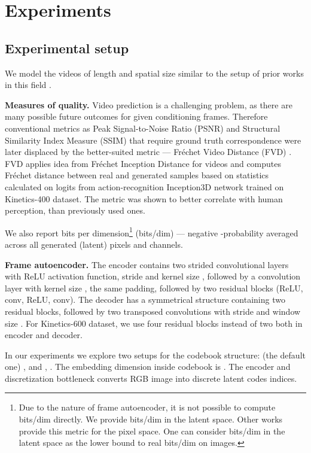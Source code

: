 \documentclass{article}
\begin{document}
 \section{Experiments}


\subsection{Experimental setup}

We model the videos of length  and spatial size  similar to the setup of prior works in this field \cite{dvdgan, vt}.

\textbf{Measures of quality.} Video prediction is a challenging problem, as there are many possible future outcomes for given conditioning frames. Therefore conventional metrics as Peak Signal-to-Noise Ratio (PSNR) and Structural Similarity Index Measure (SSIM) that require ground truth correspondence were later displaced by the better-suited metric --- Fréchet Video Distance (FVD) \cite{fid}. FVD applies idea from Fréchet Inception Distance \cite{fid} for videos and computes Fréchet distance between real and generated samples based on statistics calculated on logits from action-recognition Inception3D network trained on Kinetics-400 \cite{kinetics400_dataset} dataset. The metric was shown to better correlate with human perception, than previously used ones. 

We also report bits per dimension\footnote{Due to the nature of frame autoencoder, it is not possible to compute bits/dim directly. We provide bits/dim in the latent space. Other works provide this metric for the pixel space. One can consider bits/dim in the latent space as the lower bound to real bits/dim on images.} (bits/dim) --- negative -probability averaged across all generated (latent) pixels and channels.




\textbf{Frame autoencoder.} The encoder contains two strided convolutional layers with ReLU activation function, stride  and kernel size , followed by a convolution layer with kernel size , the same padding, followed by two residual blocks (ReLU,  conv, ReLU,  conv). The decoder has a symmetrical structure containing two residual blocks, followed by two transposed convolutions with stride  and window size . For Kinetics-600 dataset, we use four residual blocks instead of two both in encoder and decoder.

In our experiments we explore two setups for the codebook structure: (the default one) ,  and , . The embedding dimension inside codebook is . The encoder and discretization bottleneck converts  RGB image into  discrete latent codes indices.
\end{document}
